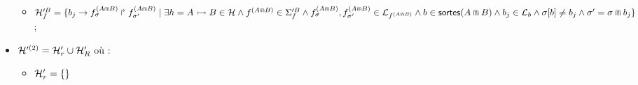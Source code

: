 \begin{definition}
\begin{itemize}
\begin{itemize}
        \item $\mathcal{H}'^B_{f} = \{ b_j\rightarrow f^{(A \Cap B)}_\sigma\Rsh f^{(A \Cap B)}_{\sigma'} \mid
          \exists h = \mbox{$A \rightarrowtail B$} \in \mathcal{H} \wedge
          f^{(A \Cap B)} \in \Sigma'^B_{f} \wedge
          f^{(A \Cap B)}_\sigma , f^{(A \Cap B)}_{\sigma'} \in \mathcal{L}_{f^{(A \Cap B)}} \wedge
          b \in \mathsf{sortes}(A \Cap B) \wedge b_j \in \mathcal{L}_b \wedge
          {\sigma[b]} \neq b_j \wedge \sigma' = \sigma \Cap b_j \}$;
      \end{itemize}
    \item $\mathcal{H}'^{(2)} = \mathcal{H}'_{r} \cup \mathcal{H}'_R$ où :
      \begin{itemize}
        \item $\mathcal{H}'_{r} = \{  \}$
      \end{itemize}


  \end{itemize}
\end{definition}





